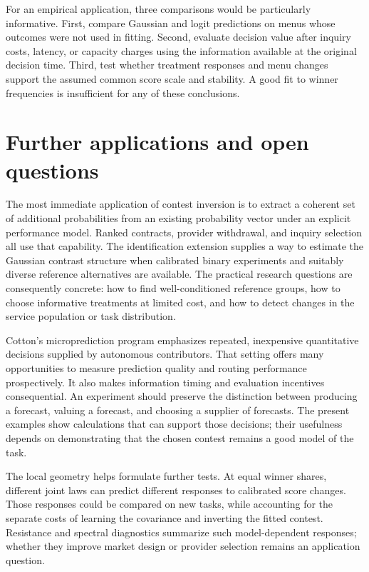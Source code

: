 \documentclass[11pt]{amsart}
\theoremstyle{definition}
\begin{document}
For an empirical application, three comparisons would be particularly informative. First, compare Gaussian and logit predictions on menus whose outcomes were not used in fitting. Second, evaluate decision value after inquiry costs, latency, or capacity charges using the information available at the original decision time. Third, test whether treatment responses and menu changes support the assumed common score scale and stability. A good fit to winner frequencies is insufficient for any of these conclusions.

\section{Further applications and open questions}
The most immediate application of contest inversion is to extract a coherent set of additional probabilities from an existing probability vector under an explicit performance model. Ranked contracts, provider withdrawal, and inquiry selection all use that capability. The identification extension supplies a way to estimate the Gaussian contrast structure when calibrated binary experiments and suitably diverse reference alternatives are available. The practical research questions are consequently concrete: how to find well-conditioned reference groups, how to choose informative treatments at limited cost, and how to detect changes in the service population or task distribution.

Cotton's microprediction program emphasizes repeated, inexpensive quantitative decisions supplied by autonomous contributors. That setting offers many opportunities to measure prediction quality and routing performance prospectively. It also makes information timing and evaluation incentives consequential. An experiment should preserve the distinction between producing a forecast, valuing a forecast, and choosing a supplier of forecasts. The present examples show calculations that can support those decisions; their usefulness depends on demonstrating that the chosen contest remains a good model of the task.

The local geometry helps formulate further tests. At equal winner shares,
different joint laws can predict different responses to calibrated score
changes. Those responses could be compared on new tasks, while accounting
for the separate costs of learning the covariance and inverting the fitted
contest. Resistance and spectral diagnostics summarize such model-dependent
responses; whether they improve market design or provider selection remains
an application question.



\end{document}
